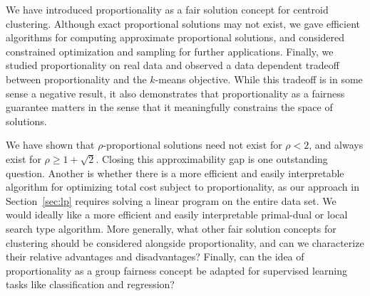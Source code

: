 We have introduced proportionality as a fair solution concept for centroid clustering. Although exact proportional solutions may not exist, we gave efficient algorithms for computing approximate proportional solutions, and considered constrained optimization and sampling for further applications. Finally, we studied proportionality on real data and observed a data dependent tradeoff between proportionality and the $k$-means objective. While this tradeoff is in some sense a negative result, it also demonstrates that proportionality as a fairness guarantee matters in the sense that it meaningfully constrains the space of solutions. 

We have shown that $\rho$-proportional solutions need not exist for $\rho < 2$, and always exist for $\rho \geq 1+\sqrt{2}$. Closing this approximability gap is one outstanding question. Another is whether there is a more efficient and easily interpretable algorithm for optimizing total cost subject to proportionality, as our approach in Section~\ref{sec:lp} requires solving a linear program on the entire data set. We would ideally like a more efficient and easily interpretable primal-dual or local search type algorithm. More generally, what other fair solution concepts for clustering should be considered alongside proportionality, and can we characterize their relative advantages and disadvantages? Finally, can the idea of proportionality as a group fairness concept be adapted for supervised learning tasks like classification and regression? 